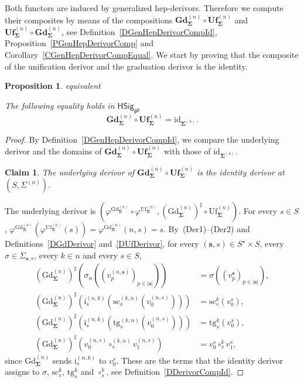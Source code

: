 \documentclass[a4paper, reqno]{amsbook}
\makeatletter
\newcommand{\bb}[1]{\ensuremath{\lvert #1 \rvert}}
\newcommand{\sig}[1]{\mathbf{#1}}             %
\newcommand{\gd}{\mathfrak{gd}}              %
\newcommand{\id}{\mathrm{id}}
\newcommand{\src}{\mathrm{sc}}
\newcommand{\tgt}{\mathrm{tg}}
\newcommand{\Gd}{\mathrm{Gd}}
\newcommand{\Uf}{\mathrm{Uf}}
\newcommand{\bGd}{\mathbf{Gd}}
\newcommand{\bUf}{\mathbf{Uf}}
\theoremstyle{plain}
\newtheorem{proposition}[theorem]{Proposition}
\newtheorem{claim}[theorem]{Claim}
\theoremstyle{definition}
\newcommand*{\CA@leanpending}{}
\newcommand*{\CA@leanrelation}{}
\newcommand*{\lean}[2]{%
  \ifcsname\string\color@lean@#1\endcsname\else
    \PackageError{main}{Unknown relation `#1' in \string\lean}{Use equivalent, weaker or stronger.}%
  \fi
  \gdef\CA@leanrelation{#1}%
  \gdef\CA@leanpending{#2}}
\makeatother
\begin{document}
Both functors are induced by generalized hep-derivors.
Therefore we compute their composites by means of the compositions $\bGd^{(n)}_{\sig{\Sigma}}\circ\bUf^{(n)}_{\sig{\Sigma}}$ and $\bUf^{(n)}_{\sig{\Sigma}}\circ\bGd^{(n)}_{\sig{\Sigma}}$, see Definition~\ref{DGenHepDerivorCompId}, Proposition~\ref{PGenHepDerivorComp} and Corollary~\ref{CGenHepDerivorCompEqual}.
We start by proving that the composite of the unification derivor and the graduation derivor is the identity.

\begin{proposition}\label{PGdUfDerivorId}\lean{equivalent}{Presentations.unification_comp_graduation}
The following equality holds in $\mathsf{HSig}_{\gd}$
$$
\bGd^{(n)}_{\sig{\Sigma}}\circ\bUf^{(n)}_{\sig{\Sigma}}=\id_{\sig{\Sigma}^{(n)}}.
$$
\end{proposition}
\begin{proof}
By Definition~\ref{DGenHepDerivorCompId}, we compare the underlying derivor and the domains of $\bGd^{(n)}_{\sig{\Sigma}}\circ\bUf^{(n)}_{\sig{\Sigma}}$ with those of $\id_{\sig{\Sigma}^{(n)}}$.
\begin{claim}\label{ClGdUfDerivorIdA}
The underlying derivor of $\bGd^{(n)}_{\sig{\Sigma}}\circ\bUf^{(n)}_{\sig{\Sigma}}$ is the identity derivor at $(S,\Sigma^{(n)})$.
\end{claim}
The underlying derivor is $(\varphi^{\Gd^{(n)}_{\sig{\Sigma}}}\circ\varphi^{\Uf^{(n)}_{\sig{\Sigma}}},(\Gd^{(n)}_{\sig{\Sigma}})^{\sharp}\circ\Uf^{(n)}_{\sig{\Sigma}})$.
For every $s\in S$, $\varphi^{\Gd^{(n)}_{\sig{\Sigma}}}(\varphi^{\Uf^{(n)}_{\sig{\Sigma}}}(s))=\varphi^{\Gd^{(n)}_{\sig{\Sigma}}}(n,s)=s$.
By~(Der1)--(Der2) and Definitions~\ref{DGdDerivor} and~\ref{DUfDerivor}, for every $(\mathbf{s},s)\in S^{\star}\times S$, every $\sigma\in\Sigma_{\mathbf{s},s}$, every $k\in n$ and every $s\in S$,
\begin{align*}
(\Gd^{(n)}_{\sig{\Sigma}})^{\sharp}\left(\sigma_{n}\left((v^{(n,\mathbf{s})}_{p})_{p\in\bb{\mathbf{s}}}\right)\right)&=\sigma\left((v^{\mathbf{s}}_{p})_{p\in\bb{\mathbf{s}}}\right),\\
(\Gd^{(n)}_{\sig{\Sigma}})^{\sharp}\left(\mathrm{i}^{(n,k)}_{s}\left(\src^{(k,n)}_{s}(v^{(n,s)}_{0})\right)\right)&=\src^{k}_{s}(v^{s}_{0}),\\
(\Gd^{(n)}_{\sig{\Sigma}})^{\sharp}\left(\mathrm{i}^{(n,k)}_{s}\left(\tgt^{(k,n)}_{s}(v^{(n,s)}_{0})\right)\right)&=\tgt^{k}_{s}(v^{s}_{0}),\\
(\Gd^{(n)}_{\sig{\Sigma}})^{\sharp}\left(v^{(n,s)}_{0}\circ^{(k,n)}_{s}v^{(n,s)}_{1}\right)&=v^{s}_{0}\circ^{k}_{s}v^{s}_{1},
\end{align*}
since $\Gd^{(n)}_{\sig{\Sigma}}$ sends $\mathrm{i}^{(n,k)}_{s}$ to $v^{s}_{0}$.
These are the terms that the identity derivor assigns to $\sigma$, $\src^{k}_{s}$, $\tgt^{k}_{s}$ and $\circ^{k}_{s}$, see Definition~\ref{DDerivorCompId}.


\end{proof}
\end{document}
